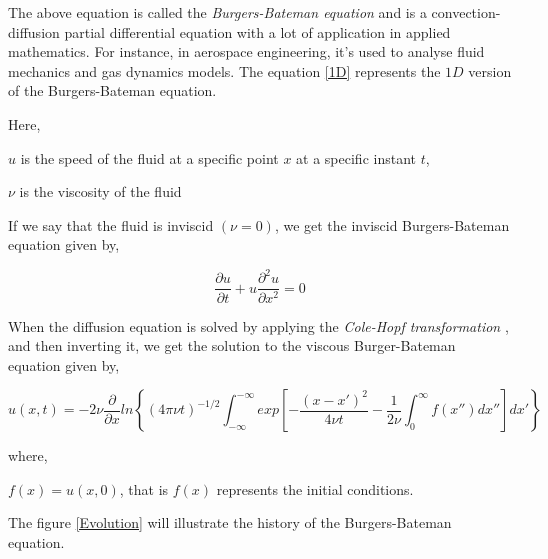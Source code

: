\documentclass{article}
\begin{document}
\begin{flushleft}
    The above equation is called the \textit{Burgers-Bateman equation} \cite{Musha_1978} and is a convection-diffusion partial differential equation with a lot of application in applied mathematics. For instance, in aerospace engineering, it's used to analyse fluid mechanics and gas dynamics models. The equation \ref{1D} represents the $1D$ version of the Burgers-Bateman equation. 

\bigskip

    Here,

    \bigskip
    
    $u$ is the speed of the fluid at a specific point $x$ at a specific instant $t$,

    \medskip

    $\nu$ is the viscosity of the fluid

    \bigskip

    If we say that the fluid is inviscid $(\nu=0)$, we get the inviscid Burgers-Bateman equation given by,

    \begin{equation}\label{inviscid}
        \frac{\partial u}{\partial t} + u \frac{\partial^2 u}{\partial x^2} = 0
    \end{equation}

    \bigskip

    When the diffusion equation is solved by applying the \textit{Cole-Hopf transformation} \cite{evans2022partial}, and then inverting it, we get the solution to the viscous Burger-Bateman equation given by,

    \begin{equation}
        u(x,t) = -2\nu \frac{\partial}{\partial x} ln \left\{ (4\pi\nu t)^{-1/2} \int_{-\infty}^{-\infty}exp \left[ -\frac{(x-x')^2}{4\nu t} - \frac{1}{2\nu} \int_{0}^{\infty} f (x'')dx'' \right] dx' \right\}
    \end{equation}

    \bigskip

    where,

    \bigskip

    $f(x) = u(x,0)$, that is $f(x)$ represents the initial conditions.

    \bigskip

    The figure \ref{Evolution} will illustrate the history of the Burgers-Bateman equation.

    \bigskip


\end{flushleft}
\end{document}
